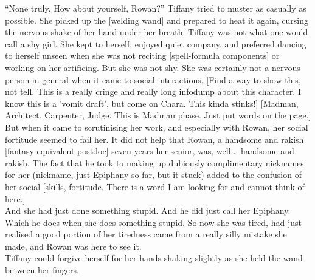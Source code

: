``None truly. How about yourself, Rowan?'' Tiffany tried to muster as casually as possible. 
She picked up the [welding wand] and prepared to heat it again, cursing the nervous shake of her hand under her breath.
Tiffany was not what one would call a shy girl. 
She kept to herself, enjoyed quiet company, and preferred dancing to herself unseen when she was not reciting [spell-formula components] or working on her artificing. 
But she was not shy.
She was certainly not a nervous person in general when it came to social interactions. 
[Find a way to show this, not tell. 
This is a really cringe and really long infodump about this character. 
I know this is a 'vomit draft', but come on Chara. This kinda stinks!]
[Madman, Architect, Carpenter, Judge. 
This is Madman phase. 
Just put words on the page.]\\

But when it came to scrutinising her work, and especially with Rowan, her social fortitude seemed to fail her.
It did not help that Rowan, a handsome and rakish [fantasy-equivalent postdoc] seven years her senior, was, well... handsome and rakish.
The fact that he took to making up dubiously complimentary nicknames for her (nickname, just Epiphany so far, but it stuck) added to the confusion of her social [skills, fortitude. There is a word I am looking for and cannot think of here.]\\

And she had just done something stupid.
And he did just call her Epiphany.
Which he does when she does something stupid.
So now she was tired, had just realised a good portion of her tiredness came from a really silly mistake she made, and Rowan was here to see it.\\

Tiffany could forgive herself for her hands shaking slightly as she held the wand between her fingers.\\
